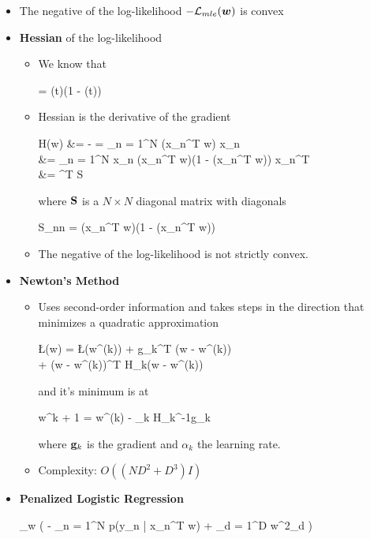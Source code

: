 \begin{itemize}
	\item The negative of the log-likelihood $- \mathcal{L}_{mle}(\bm w)$ is convex
	\item \textbf{Hessian} of the log-likelihood
	\begin{itemize}
		\item We know that
		\begin{myalign*}
		     = \sigma(t)(1 - \sigma(t))
		\end{myalign*}
		\item Hessian is the derivative of the gradient
		\begin{myalign*}
		    \*H(\bm w) &= -   = \sum_{n = 1}^N  \sigma(\bm x_n^T \bm w) \bm x_n\\
		    &= \sum_{n = 1}^N \bm x_n \sigma(\bm x_n^T \bm w)(1 - \sigma(\bm x_n^T \bm w)) \bm x_n^T\\
		    &= ^T \*S \tilde{\*X}
		\end{myalign*}
		where $\mathbf{S}$ is a $N \times N$ diagonal matrix with diagonals
		\begin{myalign*}
		    S_{nn} = \sigma(\bm x_n^T \bm w)(1 - \sigma(\bm x_n^T \bm w))
		\end{myalign*}
		\item The negative of the log-likelihood is not strictly convex.
	\end{itemize}
	\item \textbf{Newton's Method} %
	\begin{itemize}
		\item Uses second-order information and takes steps in the direction that minimizes a quadratic approximation
		\begin{myalign*}
		    \L(\bm w) = \L(\bm w^{(k)}) + \*g_k^T (\bm w - \bm w^{(k)})\\ + (\bm w - \bm w^{(k)})^T \*H_k(\bm w - \bm w^{(k)})
		\end{myalign*}
		and it's minimum is at
		\begin{myalign*}
		    \bm w^{k + 1} = \bm w^{(k)} - \alpha_k \*H_k^{-1}\*g_k
		\end{myalign*}
		where $\mathbf{g}_k$ is the gradient and $\alpha_k$ the learning rate.
		\item Complexity: $O((ND^2 + D^3)I)$
	\end{itemize}
	\item \textbf{Penalized Logistic Regression}
	\begin{myalign*}
	    \min_{\bm w} 
	    \left(
	    	- \sum_{n = 1}^N \log p(y_n | \*x_n^T \bm w) + \lambda \sum_{d = 1}^D w^2_d
	    \right)
	\end{myalign*}
\end{itemize}

